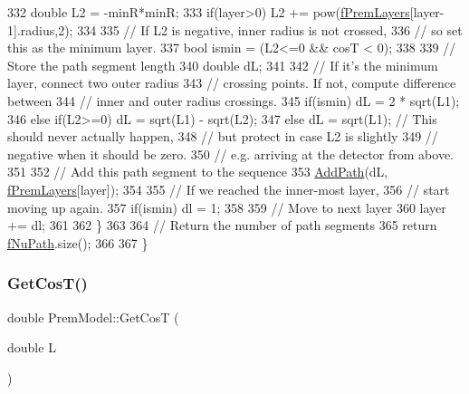 \begin{DoxyCode}
332     \textcolor{keywordtype}{double} L2 = -minR*minR;
333     \textcolor{keywordflow}{if}(layer>0) L2 += pow(\hyperlink{classOscProb_1_1PremModel_a19a9a3b23ec154ad7a29f92b74aa5bc6}{fPremLayers}[layer-1].radius,2);
334     
335     \textcolor{comment}{// If L2 is negative, inner radius is not crossed,}
336     \textcolor{comment}{// so set this as the minimum layer.}
337     \textcolor{keywordtype}{bool} ismin = (L2<=0 && cosT < 0);
338 
339     \textcolor{comment}{// Store the path segment length}
340     \textcolor{keywordtype}{double} dL;
341     
342     \textcolor{comment}{// If it's the minimum layer, connect two outer radius }
343     \textcolor{comment}{// crossing points. If not, compute difference between}
344     \textcolor{comment}{// inner and outer radius crossings.}
345     \textcolor{keywordflow}{if}(ismin)      dL = 2 * sqrt(L1);
346     \textcolor{keywordflow}{else} \textcolor{keywordflow}{if}(L2>=0) dL = sqrt(L1) - sqrt(L2);
347     \textcolor{keywordflow}{else}           dL = sqrt(L1); \textcolor{comment}{// This should never actually happen,}
348                                   \textcolor{comment}{// but protect in case L2 is slightly}
349                                   \textcolor{comment}{// negative when it should be zero.}
350                                   \textcolor{comment}{// e.g. arriving at the detector from above.}
351     
352     \textcolor{comment}{// Add this path segment to the sequence}
353     \hyperlink{classOscProb_1_1PremModel_aca013f7ac5494282834048786a0e07a6}{AddPath}(dL, \hyperlink{classOscProb_1_1PremModel_a19a9a3b23ec154ad7a29f92b74aa5bc6}{fPremLayers}[layer]);
354     
355     \textcolor{comment}{// If we reached the inner-most layer,}
356     \textcolor{comment}{// start moving up again.}
357     \textcolor{keywordflow}{if}(ismin) dl = 1;
358     
359     \textcolor{comment}{// Move to next layer}
360     layer += dl;
361   
362   \}
363 
364   \textcolor{comment}{// Return the number of path segments}
365   \textcolor{keywordflow}{return} \hyperlink{classOscProb_1_1PremModel_aaf3c77e35798d664853157013c90ad2b}{fNuPath}.size();
366 
367 \}
\end{DoxyCode}
\mbox{\label{classOscProb_1_1PremModel_a5328474bdbb703eb4c9d4df49999cda6}} 
\subsubsection{\texorpdfstring{Get\+Cos\+T()}{GetCosT()}}
{\footnotesize\ttfamily double Prem\+Model\+::\+Get\+CosT (\begin{DoxyParamCaption}\item[{double}]{L }\end{DoxyParamCaption})\hspace{0.3cm}{\ttfamily [virtual]}}

